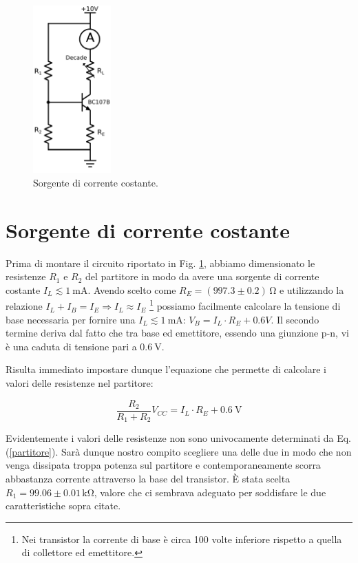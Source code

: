 \begin{figure}
	\includegraphics[width=30mm]{cc1.pdf}
	\caption{Sorgente di corrente costante.}
	\label{fig:cc1}
\end{figure}

\section{Sorgente di corrente costante}
Prima di montare il circuito riportato in Fig. \ref{fig:cc1}, abbiamo dimensionato le resistenze $R_1$ e $R_2$ del partitore in modo da avere una sorgente di corrente costante $I_L \lesssim \SI{1}{\milli\ampere}$.
Avendo scelto come $R_E=(997.3 \pm 0.2)\,\si{\ohm}$ e utilizzando la relazione $I_L+I_B=I_E \Rightarrow I_L \approx I_E$ \footnote{Nei transistor la corrente di base è circa 100 volte inferiore rispetto a quella di collettore ed emettitore.} possiamo facilmente calcolare la tensione di base necessaria per fornire una $I_L \lesssim \SI{1}{\milli\ampere}$: $V_B=I_L \cdot R_E + 0.6V$.
Il secondo termine deriva dal fatto che tra base ed emettitore, essendo una giunzione p-n, vi è una caduta di tensione pari a $\SI{0.6}{\volt}$.

Risulta immediato impostare dunque l'equazione che permette di calcolare i valori delle resistenze nel partitore:

\begin{equation}
\frac{R_2}{R_1+R_2} V_{CC}=I_L \cdot R_E + \SI{0.6}{\volt}
\label{partitore}
\end{equation}

Evidentemente i valori delle resistenze non sono univocamente determinati da Eq. (\ref{partitore}).
Sarà dunque nostro compito scegliere una delle due in modo che non venga dissipata troppa potenza sul partitore e contemporaneamente scorra abbastanza corrente attraverso la base del transistor.
È stata scelta $R_1=99.06 \pm 0.01 \,\si{\kilo\ohm}$, valore che ci sembrava adeguato per soddisfare le due caratteristiche sopra citate.

